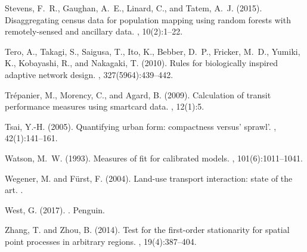 \documentclass[11pt]{article}
\begin{document}
\begin{multicols}{2}
\begin{thebibliography}{}
Stevens, F.~R., Gaughan, A.~E., Linard, C., and Tatem, A.~J. (2015).
\newblock Disaggregating census data for population mapping using random
  forests with remotely-sensed and ancillary data.
, 10(2):1--22.

Tero, A., Takagi, S., Saigusa, T., Ito, K., Bebber, D.~P., Fricker, M.~D.,
  Yumiki, K., Kobayashi, R., and Nakagaki, T. (2010).
\newblock Rules for biologically inspired adaptive network design.
, 327(5964):439--442.

Tr{\'e}panier, M., Morency, C., and Agard, B. (2009).
\newblock Calculation of transit performance measures using smartcard data.
, 12(1):5.

Tsai, Y.-H. (2005).
\newblock Quantifying urban form: compactness versus' sprawl'.
, 42(1):141--161.

Watson, M.~W. (1993).
\newblock Measures of fit for calibrated models.
, 101(6):1011--1041.

Wegener, M. and F{\"u}rst, F. (2004).
\newblock Land-use transport interaction: state of the art.
.

West, G. (2017).
.
\newblock Penguin.

Zhang, T. and Zhou, B. (2014).
\newblock Test for the first-order stationarity for spatial point processes in
  arbitrary regions.
, 19(4):387--404.

\end{thebibliography}



\end{multicols}
\end{document}
